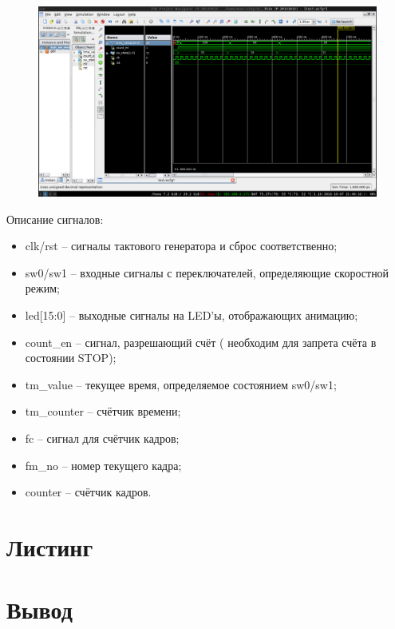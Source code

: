 \documentclass[a4paper, 10pt]{article}
\begin{document}
        \begin{figure}[h!]
            \includegraphics[scale=0.7]{../images/sw_mode.png}
        \end{figure}
        Описание сигналов:
        \begin{itemize}
            \item clk/rst -- сигналы тактового генератора и сброс соответственно;
            \item sw0/sw1 -- входные сигналы с переключателей, определяющие скоростной режим;
            \item led[15:0] -- выходные сигналы на LED'ы, отображающих анимацию;
            \item count\_en -- сигнал, разрешающий счёт ( необходим для запрета счёта в состоянии STOP);
            \item tm\_value -- текущее время, определяемое состоянием sw0/sw1;
            \item tm\_counter -- счётчик времени;
            \item fc -- сигнал для счётчик кадров;
            \item fm\_no -- номер текущего кадра;
            \item counter -- счётчик кадров.
        \end{itemize}

     \section*{Листинг}
        
        
        
        
        
        

    \section*{Вывод}
\end{document}
